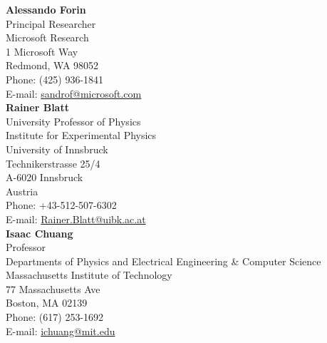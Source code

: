 \documentclass[letter]{article}
\begin{document}
{\bf Alessando Forin}\\
Principal Researcher\\
Microsoft Research\\
1 Microsoft Way\\
Redmond, WA 98052\\
Phone: (425) 936-1841\\
E-mail: \url{sandrof@microsoft.com}\\

{\bf Rainer Blatt}\\
University Professor of Physics\\
Institute for Experimental Physics\\
University of Innsbruck\\
Technikerstrasse 25/4\\
A-6020 Innsbruck\\
Austria\\
Phone: +43-512-507-6302\\
E-mail: \url{Rainer.Blatt@uibk.ac.at}\\

{\bf Isaac Chuang}\\
Professor\\
Departments of Physics and Electrical Engineering \& Computer Science\\
Massachusetts Institute of Technology\\
77 Massachusetts Ave\\
Boston, MA 02139\\
Phone: (617) 253-1692\\
E-mail: \url{ichuang@mit.edu}\\


\end{document}
